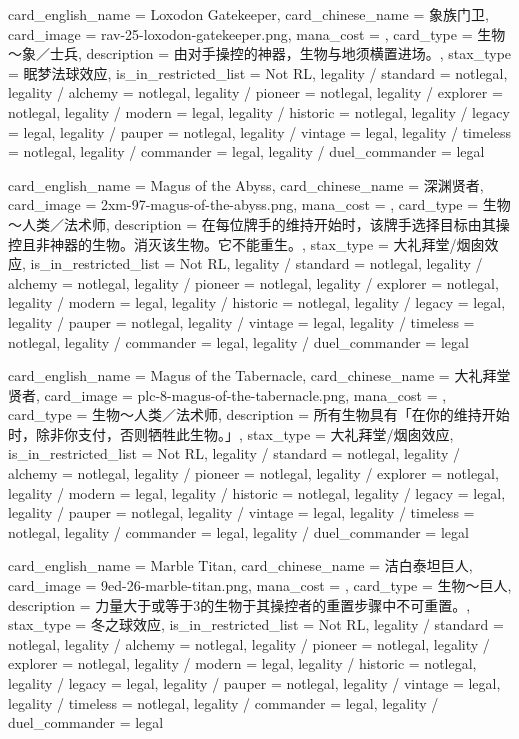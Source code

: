 \documentclass[lang = cn, color = black, 10pt]{AllThatStax}
\begin{document}
\card
{
	card_english_name = {Loxodon Gatekeeper},
	card_chinese_name = {象族门卫},
	card_image = rav-25-loxodon-gatekeeper.png,
	mana_cost = ,
	card_type = 生物～象／士兵,
	description = {由对手操控的神器，生物与地须横置进场。},
	stax_type = 眠梦法球效应,
	is_in_restricted_list = Not RL,
	legality / standard = notlegal,
	legality / alchemy = notlegal,
	legality / pioneer = notlegal,
	legality / explorer = notlegal,
	legality / modern = legal,
	legality / historic = notlegal,
	legality / legacy = legal,
	legality / pauper = notlegal,
	legality / vintage = legal,
	legality / timeless = notlegal,
	legality / commander = legal,
	legality / duel_commander = legal
}

\card
{
	card_english_name = {Magus of the Abyss},
	card_chinese_name = {深渊贤者},
	card_image = 2xm-97-magus-of-the-abyss.png,
	mana_cost = ,
	card_type = 生物 ～人类／法术师,
	description = {在每位牌手的维持开始时，该牌手选择目标由其操控且非神器的生物。消灭该生物。它不能重生。},
	stax_type = 大礼拜堂/烟囱效应,
	is_in_restricted_list = Not RL,
	legality / standard = notlegal,
	legality / alchemy = notlegal,
	legality / pioneer = notlegal,
	legality / explorer = notlegal,
	legality / modern = legal,
	legality / historic = notlegal,
	legality / legacy = legal,
	legality / pauper = notlegal,
	legality / vintage = legal,
	legality / timeless = notlegal,
	legality / commander = legal,
	legality / duel_commander = legal
}

\card
{
	card_english_name = {Magus of the Tabernacle},
	card_chinese_name = {大礼拜堂贤者},
	card_image = plc-8-magus-of-the-tabernacle.png,
	mana_cost = ,
	card_type = 生物～人类／法术师,
	description = {所有生物具有「在你的维持开始时，除非你支付，否则牺牲此生物。」},
	stax_type = 大礼拜堂/烟囱效应,
	is_in_restricted_list = Not RL,
	legality / standard = notlegal,
	legality / alchemy = notlegal,
	legality / pioneer = notlegal,
	legality / explorer = notlegal,
	legality / modern = legal,
	legality / historic = notlegal,
	legality / legacy = legal,
	legality / pauper = notlegal,
	legality / vintage = legal,
	legality / timeless = notlegal,
	legality / commander = legal,
	legality / duel_commander = legal
}

\card
{
	card_english_name = {Marble Titan},
	card_chinese_name = {洁白泰坦巨人},
	card_image = 9ed-26-marble-titan.png,
	mana_cost = ,
	card_type = 生物～巨人,
	description = {力量大于或等于3的生物于其操控者的重置步骤中不可重置。},
	stax_type = 冬之球效应,
	is_in_restricted_list = Not RL,
	legality / standard = notlegal,
	legality / alchemy = notlegal,
	legality / pioneer = notlegal,
	legality / explorer = notlegal,
	legality / modern = legal,
	legality / historic = notlegal,
	legality / legacy = legal,
	legality / pauper = notlegal,
	legality / vintage = legal,
	legality / timeless = notlegal,
	legality / commander = legal,
	legality / duel_commander = legal
}
\end{document}
